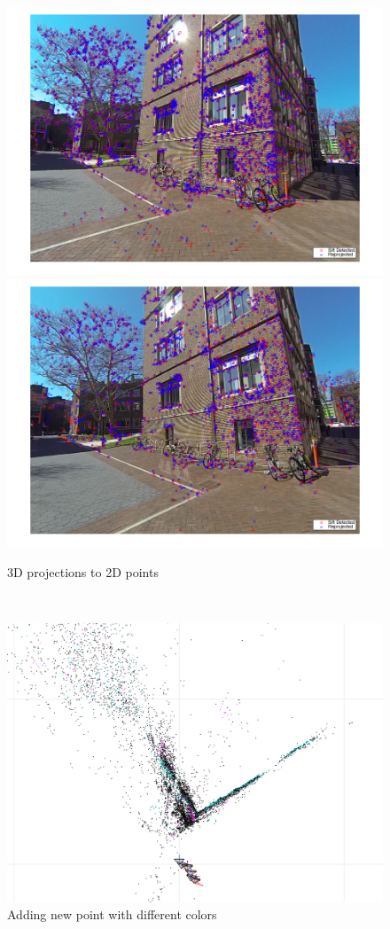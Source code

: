 \documentclass[10pt,letterpaper]{article}
\begin{document}
\begin{enumerate}[]
\begin{figure}[h!]
 \center
  \includegraphics[width=5in]{../images/final-img5}
  \includegraphics[width=5in]{../images/final-img6}
  \caption
   {3D projections to 2D points}
\end{figure} \\

\begin{figure}[h!]
 \center
  \includegraphics[width=5in]{../images/diff_colors_per_iteration_3D}
  \caption
   {Adding new point with different colors}
\end{figure} \\


\end{enumerate}
\end{document}
